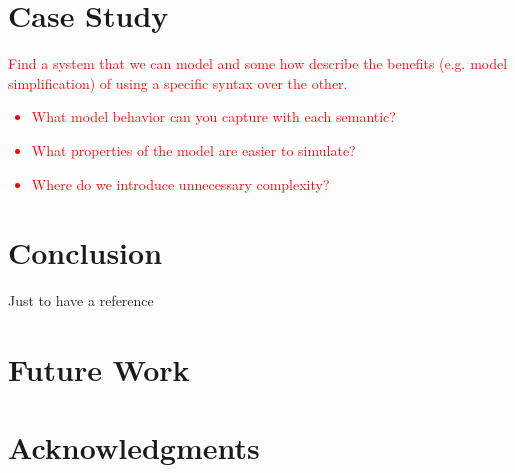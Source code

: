 \documentclass{easychair}
\begin{document}
\section{Case Study}
\label{sect:caseS}

\textcolor{red}{Find a system that we can model and some how describe the benefits 
(e.g. model simplification) of using a specific syntax over the other.
	\begin{itemize}
		\item What model behavior can you capture with each semantic?
		\item What properties of the model are easier to simulate?
		\item Where do we introduce unnecessary complexity?
	\end{itemize}	
}

\section{Conclusion}
\label{sect:concl}

Just to have a reference ~\cite{texniccenter}

\section{Future Work}
\label{sect:future-work}



\section{Acknowledgments}
\label{sect:acks}


\label{sect:bib}

%
%
%




\end{document}

